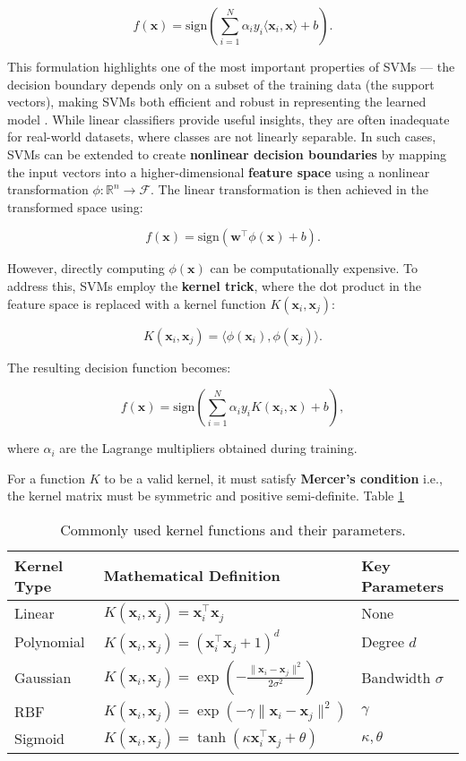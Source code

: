 \[
f(\mathbf{x}) = \text{sign}\left(\sum_{i=1}^{N} \alpha_i y_i \langle \mathbf{x}_i, \mathbf{x} \rangle + b\right).
\]

This formulation highlights one of the most important properties of SVMs --- the decision boundary depends only on a subset of the training data (the support vectors), making SVMs both efficient and robust in representing the learned model \citep{cervantes2020}. While linear classifiers provide useful insights, they are often inadequate for real-world datasets, where classes are not linearly separable. In such cases, SVMs can be extended to create \textbf{nonlinear decision boundaries} by mapping the input vectors into a higher-dimensional \textbf{feature space} using a nonlinear transformation \(\phi: \mathbb{R}^n \rightarrow \mathcal{F}\). The linear transformation is then achieved in the transformed space using:

\[
f(\mathbf{x}) = \text{sign}(\mathbf{w}^\top \phi(\mathbf{x}) + b).
\]

However, directly computing \(\phi(\mathbf{x})\) can be computationally expensive. To address this, SVMs employ the \textbf{kernel trick}, where the dot product in the feature space is replaced with a kernel function \(K(\mathbf{x}_i, \mathbf{x}_j)\):

\[
K(\mathbf{x}_i, \mathbf{x}_j) = \langle \phi(\mathbf{x}_i), \phi(\mathbf{x}_j) \rangle.
\]

The resulting decision function becomes:

\[
f(\mathbf{x}) = \text{sign}\left(\sum_{i=1}^{N} \alpha_i y_i K(\mathbf{x}_i, \mathbf{x}) + b\right),
\]

where \(\alpha_i\) are the Lagrange multipliers obtained during training.

For a function \(K\) to be a valid kernel, it must satisfy \textbf{Mercer's condition} \citep{vapnik2013} i.e., the kernel matrix must be symmetric and positive semi-definite. Table \ref{tab:kernels-tab-static}

\begin{table}
\centering
\caption{\label{tab:kernels-tab-static}Commonly used kernel functions and their parameters.}
\centering
\fontsize{7}{9}\selectfont
\begin{tabular}[t]{l|l|l}
\hline
Kernel Type & Mathematical Definition & Key Parameters\\
\hline
Linear & $K(\mathbf{x}_i, \mathbf{x}_j) = \mathbf{x}_i^\top \mathbf{x}_j$ & None\\
\hline
Polynomial & $K(\mathbf{x}_i, \mathbf{x}_j) = (\mathbf{x}_i^\top \mathbf{x}_j + 1)^d$ & Degree $d$\\
\hline
Gaussian & $K(\mathbf{x}_i, \mathbf{x}_j) = \exp\left(-\frac{\|\mathbf{x}_i - \mathbf{x}_j\|^2}{2\sigma^2}\right)$ & Bandwidth $\sigma$\\
\hline
RBF & $K(\mathbf{x}_i, \mathbf{x}_j) = \exp(-\gamma \|\mathbf{x}_i - \mathbf{x}_j\|^2)$ & $\gamma$\\
\hline
Sigmoid & $K(\mathbf{x}_i, \mathbf{x}_j) = \tanh(\kappa \mathbf{x}_i^\top \mathbf{x}_j + \theta)$ & $\kappa, \theta$\\
\hline
\end{tabular}
\end{table}

